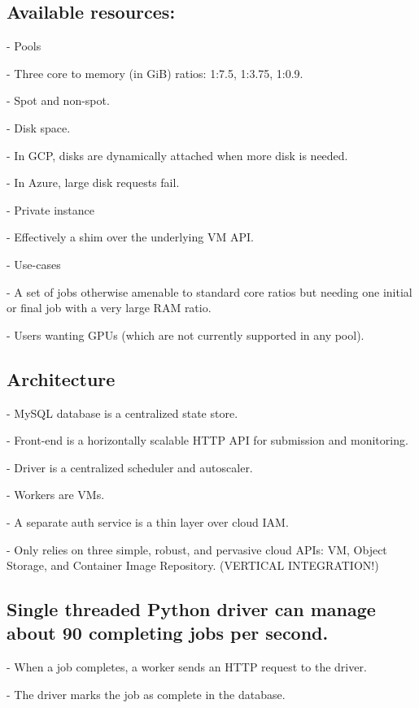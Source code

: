 \documentclass[10pt,a4paper%
]{article}
\begin{document}
\subsection{Available resources:}

    - Pools

      - Three core to memory (in GiB) ratios: 1:7.5, 1:3.75, 1:0.9.

      - Spot and non-spot.

      - Disk space.

        - In GCP, disks are dynamically attached when more disk is needed.

        - In Azure, large disk requests fail.

    - Private instance

      - Effectively a shim over the underlying VM API.

      - Use-cases

        - A set of jobs otherwise amenable to standard core ratios but needing one initial or final job with a very large RAM ratio.

        - Users wanting GPUs (which are not currently supported in any pool).

\subsection{Architecture}

    - MySQL database is a centralized state store.

    - Front-end is a horizontally scalable HTTP API for submission and monitoring.

    - Driver is a centralized scheduler and autoscaler.

    - Workers are VMs.

    - A separate auth service is a thin layer over cloud IAM.

    - Only relies on three simple, robust, and pervasive cloud APIs: VM, Object Storage, and Container Image Repository. (VERTICAL INTEGRATION!)

\subsection{Single threaded Python driver can manage about 90 completing jobs per second.}

    - When a job completes, a worker sends an HTTP request to the driver.

    - The driver marks the job as complete in the database.
\end{document}
